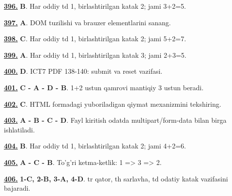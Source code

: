 \documentclass[10pt,a4paper,oneside]{article}
\begin{document}
\par\vspace{3mm}
\noindent\hyperlink{q396}{\textbf{396.}} \textbf{B}.  Har oddiy td 1, birlashtirilgan katak 2; jami 3+2=5.
\par\vspace{3mm}
\noindent\hyperlink{q397}{\textbf{397.}} \textbf{A}.  DOM tuzilishi va brauzer elementlarini sanang.
\par\vspace{3mm}
\noindent\hyperlink{q398}{\textbf{398.}} \textbf{C}.  Har oddiy td 1, birlashtirilgan katak 2; jami 5+2=7.
\par\vspace{3mm}
\noindent\hyperlink{q399}{\textbf{399.}} \textbf{A}.  Har oddiy td 1, birlashtirilgan katak 3; jami 2+3=5.
\par\vspace{3mm}
\noindent\hyperlink{q400}{\textbf{400.}} \textbf{D}.  ICT7 PDF 138-140: submit va reset vazifasi.
\par\vspace{3mm}
\noindent\hyperlink{q401}{\textbf{401.}} \textbf{C - A - D - B}.  1+2 ustun qamrovi mantiqiy 3 ustun beradi.
\par\vspace{3mm}
\noindent\hyperlink{q402}{\textbf{402.}} \textbf{C}.  HTML formadagi yuboriladigan qiymat mexanizmini tekshiring.
\par\vspace{3mm}
\noindent\hyperlink{q403}{\textbf{403.}} \textbf{A - B - C - D}.  Fayl kiritish odatda multipart/form-data bilan birga ishlatiladi.
\par\vspace{3mm}
\noindent\hyperlink{q404}{\textbf{404.}} \textbf{B}.  Har oddiy td 1, birlashtirilgan katak 2; jami 4+2=6.
\par\vspace{3mm}
\noindent\hyperlink{q405}{\textbf{405.}} \textbf{A - C - B}.  To'g'ri ketma-ketlik: 1 =\textgreater{} 3 =\textgreater{} 2.
\par\vspace{3mm}
\noindent\hyperlink{q406}{\textbf{406.}} \textbf{1-C, 2-B, 3-A, 4-D}.  tr qator, th sarlavha, td odatiy katak vazifasini bajaradi.
\end{document}
